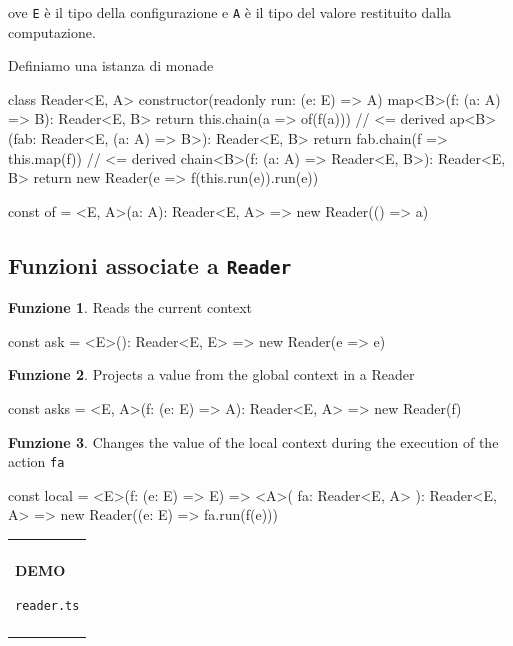 \documentclass[12pt]{article}
\theoremstyle{definition}
\newtheorem{function}{Funzione}[section]
\newenvironment{demo}
    {\begin{center}
    \begin{tabular}{|p{0.9\textwidth}|}
    \hline\\
    }
    {
    \\\\\hline
    \end{tabular}
    \end{center}
    }
\newenvironment{code}
  {\vspace{0.5cm} \VerbatimEnvironment\begin{typescriptcode}}
  {\end{typescriptcode} \vspace{0.2cm}}
\begin{document}
ove \texttt{E} è il tipo della configurazione e \texttt{A} è il tipo del valore restituito dalla computazione.

Definiamo una istanza di monade

\begin{code}
class Reader<E, A> {
  constructor(readonly run: (e: E) => A) {}
  map<B>(f: (a: A) => B): Reader<E, B> {
    return this.chain(a => of(f(a))) // <= derived
  }
  ap<B>(fab: Reader<E, (a: A) => B>): Reader<E, B> {
    return fab.chain(f => this.map(f)) // <= derived
  }
  chain<B>(f: (a: A) => Reader<E, B>): Reader<E, B> {
    return new Reader(e => f(this.run(e)).run(e))
  }
}

const of = <E, A>(a: A): Reader<E, A> =>
  new Reader(() => a)
\end{code}

\subsection{Funzioni associate a \texttt{Reader}}

\begin{function}
Reads the current context

\begin{code}
const ask = <E>(): Reader<E, E> => new Reader(e => e)
\end{code}
\end{function}

\begin{function}
Projects a value from the global context in a Reader

\begin{code}
const asks = <E, A>(f: (e: E) => A): Reader<E, A> =>
  new Reader(f)

\end{code}
\end{function}

\begin{function}
Changes the value of the local context during the execution of the action \texttt{fa}

\begin{code}
const local = <E>(f: (e: E) => E) => <A>(
  fa: Reader<E, A>
): Reader<E, A> => new Reader((e: E) => fa.run(f(e)))
\end{code}
\end{function}

\begin{demo}
\begin{center}
\textbf{DEMO}

\texttt{reader.ts}
\end{center}
\end{demo}
\end{document}
